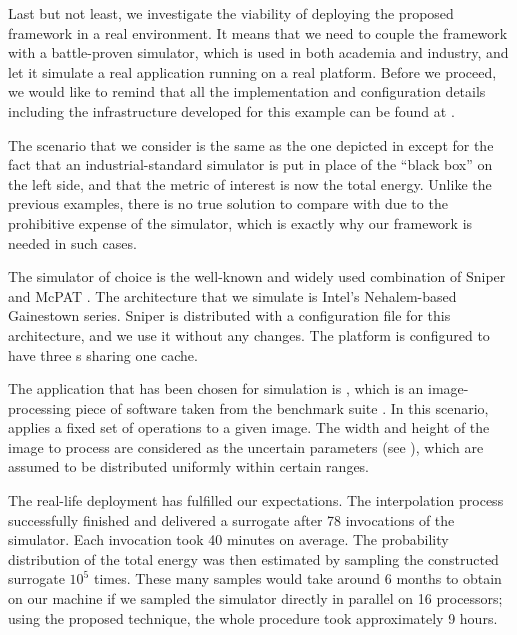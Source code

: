 
Last but not least, we investigate the viability of deploying the proposed
framework in a real environment. It means that we need to couple the framework
with a battle-proven simulator, which is used in both academia and industry, and
let it simulate a real application running on a real platform. Before we
proceed, we would like to remind that all the implementation and configuration
details including the infrastructure developed for this example can be found at
\cite{sources}.

The scenario that we consider is the same as the one depicted in 
except for the fact that an industrial-standard simulator is put in place of the
``black box'' on the left side, and that the metric of interest \g is now the
total energy. Unlike the previous examples, there is no true solution to compare
with due to the prohibitive expense of the simulator, which is exactly why our
framework is needed in such cases.

The simulator of choice is the well-known and widely used combination of Sniper
\cite{carlson2011} and McPAT \cite{li2009}. The architecture that we simulate is
Intel's Nehalem-based Gainestown series. Sniper is distributed with a
configuration file for this architecture, and we use it without any changes. The
platform is configured to have three s sharing one  cache.

The application that has been chosen for simulation is , which is an
image-processing piece of software taken from the  benchmark suite
\cite{bienia2011}. In this scenario,  applies a fixed set of operations
to a given image. The width and height of the image to process are considered as
the uncertain parameters \vu (see ), which are assumed to be
distributed uniformly within certain ranges.

The real-life deployment has fulfilled our expectations. The interpolation
process successfully finished and delivered a surrogate after 78 invocations of
the simulator. Each invocation took 40 minutes on average. The probability
distribution of the total energy was then estimated by sampling the constructed
surrogate $10^5$ times. These many samples would take around 6 months to obtain
on our machine if we sampled the simulator directly in parallel on 16
processors; using the proposed technique, the whole procedure took approximately
9 hours.
